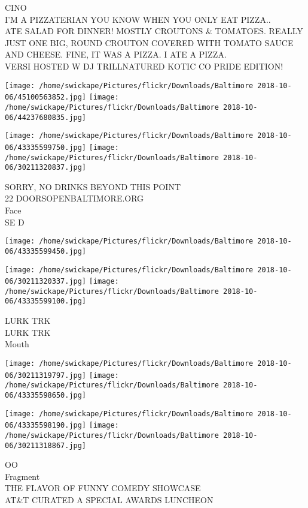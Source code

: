 \documentclass[10pt,letterpaper]{article}
\begin{document}
CINO\\
I'M A PIZZATERIAN YOU KNOW WHEN YOU ONLY EAT PIZZA..\\
ATE SALAD FOR DINNER!  MOSTLY CROUTONS \& TOMATOES.  REALLY JUST ONE BIG, ROUND CROUTON COVERED WITH TOMATO SAUCE AND CHEESE.  FINE, IT WAS A PIZZA.  I ATE A PIZZA.\\
VERSI HOSTED W DJ TRILLNATURED KOTIC CO PRIDE EDITION!\\
\pagebreak

\texttt{[image: /home/swickape/Pictures/flickr/Downloads/Baltimore 2018-10-06/45100563852.jpg]}
\texttt{[image: /home/swickape/Pictures/flickr/Downloads/Baltimore 2018-10-06/44237680835.jpg]}

\texttt{[image: /home/swickape/Pictures/flickr/Downloads/Baltimore 2018-10-06/43335599750.jpg]}
\texttt{[image: /home/swickape/Pictures/flickr/Downloads/Baltimore 2018-10-06/30211320837.jpg]}

SORRY, NO DRINKS BEYOND THIS POINT\\
22 DOORSOPENBALTIMORE.ORG\\
Face\\
SE D\\
\pagebreak

\texttt{[image: /home/swickape/Pictures/flickr/Downloads/Baltimore 2018-10-06/43335599450.jpg]}

\vspace{0.25in}
\texttt{[image: /home/swickape/Pictures/flickr/Downloads/Baltimore 2018-10-06/30211320337.jpg]}
\texttt{[image: /home/swickape/Pictures/flickr/Downloads/Baltimore 2018-10-06/43335599100.jpg]}

LURK TRK\\
LURK TRK\\
Mouth\\
\pagebreak

\texttt{[image: /home/swickape/Pictures/flickr/Downloads/Baltimore 2018-10-06/30211319797.jpg]}
\texttt{[image: /home/swickape/Pictures/flickr/Downloads/Baltimore 2018-10-06/43335598650.jpg]}

\texttt{[image: /home/swickape/Pictures/flickr/Downloads/Baltimore 2018-10-06/43335598190.jpg]}
\texttt{[image: /home/swickape/Pictures/flickr/Downloads/Baltimore 2018-10-06/30211318867.jpg]}

OO\\
Fragment\\
THE FLAVOR OF FUNNY COMEDY SHOWCASE\\
AT\&T CURATED A SPECIAL AWARDS LUNCHEON\\
\pagebreak
\end{document}

